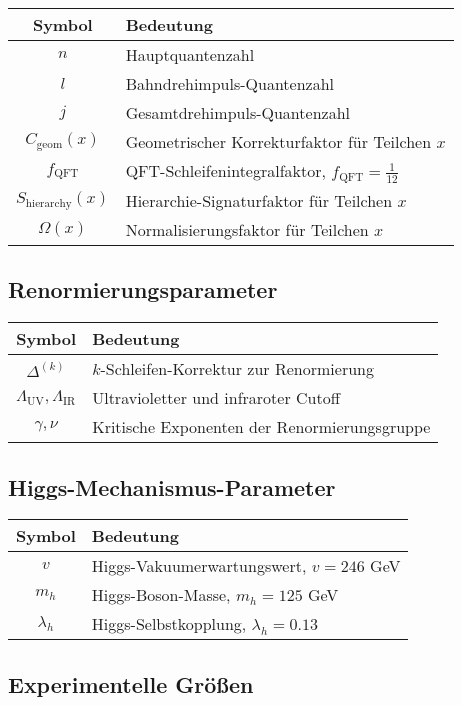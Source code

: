 \documentclass[12pt,a4paper]{article}
\numberwithin{equation}{section}
\newcommand{\Cgeom}{C_{\text{geom}}}
\newcommand{\fQFT}{f_{\text{QFT}}}
\newcommand{\Omegafactor}{\Omega}
\begin{document}
	\begin{longtable}{cl}
		\toprule
		\textbf{Symbol} & \textbf{Bedeutung} \\
		\midrule
		$n$ & Hauptquantenzahl \\
		$l$ & Bahndrehimpuls-Quantenzahl \\
		$j$ & Gesamtdrehimpuls-Quantenzahl \\
		$\Cgeom(x)$ & Geometrischer Korrekturfaktor für Teilchen $x$ \\
		$\fQFT$ & QFT-Schleifenintegralfaktor, $\fQFT = \frac{1}{12}$ \\
		$S_{\text{hierarchy}}(x)$ & Hierarchie-Signaturfaktor für Teilchen $x$ \\
		$\Omegafactor(x)$ & Normalisierungsfaktor für Teilchen $x$ \\
		\bottomrule
	\end{longtable}
	
	\subsection{Renormierungsparameter}
	
	\begin{longtable}{cl}
		\toprule
		\textbf{Symbol} & \textbf{Bedeutung} \\
		\midrule
		$\Delta^{(k)}$ & $k$-Schleifen-Korrektur zur Renormierung \\
		$\Lambda_{\text{UV}}, \Lambda_{\text{IR}}$ & Ultravioletter und infraroter Cutoff \\
		$\gamma, \nu$ & Kritische Exponenten der Renormierungsgruppe \\
		\bottomrule
	\end{longtable}
	
	\subsection{Higgs-Mechanismus-Parameter}
	
	\begin{longtable}{cl}
		\toprule
		\textbf{Symbol} & \textbf{Bedeutung} \\
		\midrule
		$v$ & Higgs-Vakuumerwartungswert, $v = 246$ GeV \\
		$m_h$ & Higgs-Boson-Masse, $m_h = 125$ GeV \\
		$\lambda_h$ & Higgs-Selbstkopplung, $\lambda_h = 0.13$ \\
		\bottomrule
	\end{longtable}
	
	\subsection{Experimentelle Größen}
	
\end{document}
